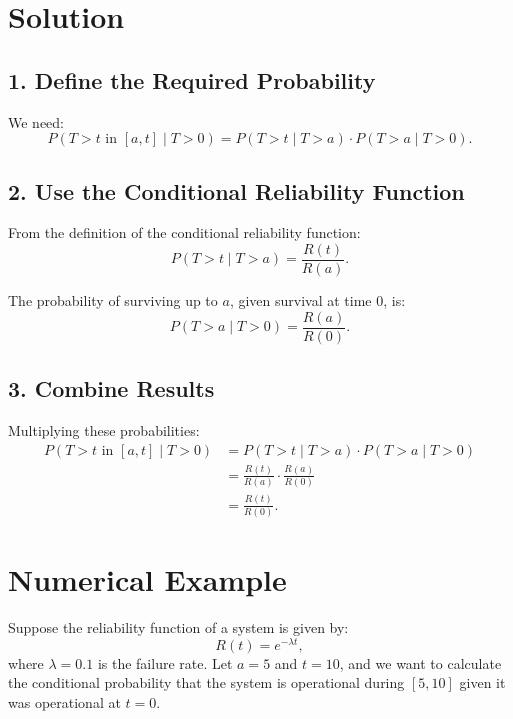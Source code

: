 \documentclass[12pt]{article}
\begin{document}
	\section*{Solution}
	\subsection*{1. Define the Required Probability}
	We need:
	\begin{equation}
		P(T > t \text{ in } [a, t] \mid T > 0) = P(T > t \mid T > a) \cdot P(T > a \mid T > 0).
	\end{equation}
	
	\subsection*{2. Use the Conditional Reliability Function}
	From the definition of the conditional reliability function:
	\begin{equation}
		P(T > t \mid T > a) = \frac{R(t)}{R(a)}.
	\end{equation}
	
	The probability of surviving up to \(a\), given survival at time 0, is:
	\begin{equation}
		P(T > a \mid T > 0) = \frac{R(a)}{R(0)}.
	\end{equation}
	
	\subsection*{3. Combine Results}
	Multiplying these probabilities:
	\begin{align}
		P(T > t \text{ in } [a, t] \mid T > 0) &= P(T > t \mid T > a) \cdot P(T > a \mid T > 0) \\
		&= \frac{R(t)}{R(a)} \cdot \frac{R(a)}{R(0)} \\
		&= \frac{R(t)}{R(0)}.
	\end{align}
	\newpage
	
	
	
	
	\section*{Numerical Example}
	Suppose the reliability function of a system is given by:
	\begin{equation}
		R(t) = e^{-\lambda t},
	\end{equation}
	where \(\lambda = 0.1\) is the failure rate. Let \(a = 5\) and \(t = 10\), and we want to calculate the conditional probability that the system is operational during \([5, 10]\) given it was operational at \(t = 0\).
	
\end{document}
